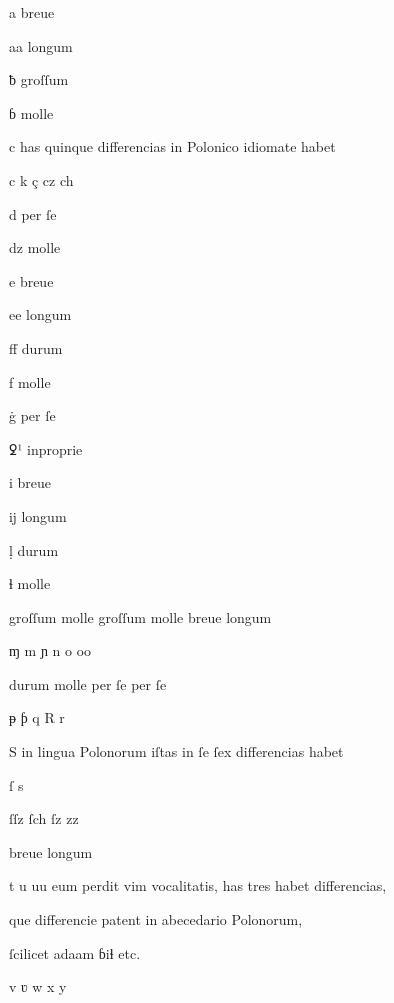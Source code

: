 {%

\newpage

\fulllines



a breue 

aa longum 

ƀ groſſum 

ɓ molle

c has quinque differencias in Polonico idiomate habet

c k ç cz ch

d per ſe 

dz molle 

e breue 

ee longum 

ﬀ durum 

f molle




ġ per ſe 

ꝿ¹  inproprie 

i breue 

ĳ longum 

ḷ durum 

ɬ molle 

groſſum molle groſſum molle breue longum

ɱ m ɲ n o oo


durum molle per ſe per ſe

ᵽ ƥ q R r

S in lingua Polonorum iſtas in ſe ſex differencias habet

ſ s 

ſſz ſch ſz zz

breue	longum


t u uu eum perdit vim vocalitatis, has tres habet differencias, 

que differencie patent in abecedario Polonorum, 

ſcilicet adaam ɓiɬ etc.

v ʋ w	x y

}

\endinput




